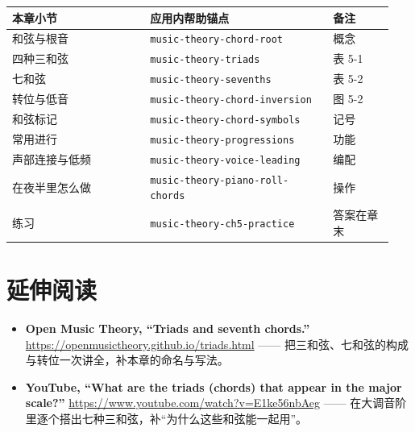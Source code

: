 \begin{center}
\footnotesize
\setlength{\tabcolsep}{3pt}
\begin{longtable}{p{0.34\linewidth}p{0.45\linewidth}p{0.15\linewidth}}
\toprule
本章小节 & 应用内帮助锚点 & 备注 \\
\midrule
\endhead
和弦与根音 & \texttt{music-theory-chord-root} & 概念 \\
四种三和弦 & \texttt{music-theory-triads} & 表 5-1 \\
七和弦 & \texttt{music-theory-sevenths} & 表 5-2 \\
转位与低音 & \texttt{music-theory-chord-inversion} & 图 5-2 \\
和弦标记 & \texttt{music-theory-chord-symbols} & 记号 \\
常用进行 & \texttt{music-theory-progressions} & 功能 \\
声部连接与低频 & \texttt{music-theory-voice-leading} & 编配 \\
在夜半里怎么做 & \texttt{music-theory-piano-roll-chords} & 操作 \\
练习 & \texttt{music-theory-ch5-practice} & 答案在章末 \\
\bottomrule
\end{longtable}
\end{center}

\section*{延伸阅读}
\begin{itemize}
  \item \textbf{Open Music Theory, “Triads and seventh chords.”} \url{https://openmusictheory.github.io/triads.html} —— 把三和弦、七和弦的构成与转位一次讲全，补本章的命名与写法。
  \item \textbf{YouTube, “What are the triads (chords) that appear in the major scale?”} \url{https://www.youtube.com/watch?v=E1ke56nbAeg} —— 在大调音阶里逐个搭出七种三和弦，补“为什么这些和弦能一起用”。
\end{itemize}


